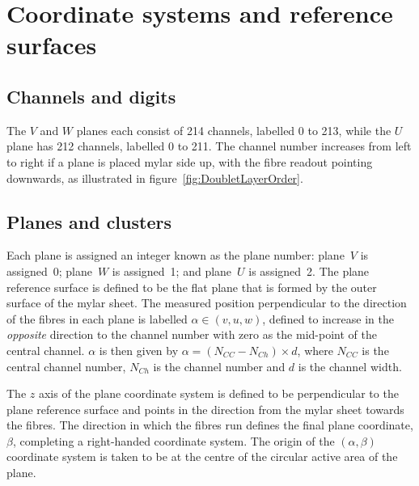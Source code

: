 \section{Coordinate systems and reference surfaces}
\label{sec:Coordinates}

  \subsection{Channels and digits}
  The $V$ and $W$ planes each consist of 214 channels, labelled 0 to 213, while the $U$ plane has 212 channels, labelled 0 to 211.  The channel number increases from left to right if a plane is placed mylar side up, with the fibre readout pointing downwards, as illustrated in figure~\ref{fig:DoubletLayerOrder}.

  \subsection{Planes and clusters}
  \label{subsec:PlaneAndClusters}
  Each plane is assigned an integer known as the plane number: plane~$V$ is assigned~0; plane~$W$ is assigned~1; and plane~$U$ is assigned~2.  The plane reference surface is defined to be the flat plane that is formed by the outer surface of the mylar sheet. The measured position perpendicular to the direction of the fibres in each plane is labelled  $\alpha \in (v, u, w)$, defined to increase in the \textit{opposite} direction to the channel number with zero as the mid-point of the central channel. $\alpha$ is then given by $\alpha = \left(N_{CC} - N_{Ch}\right) \times d$, where $N_{CC}$ is the central channel number, $N_{Ch}$ is the channel number and $d$ is the channel width.
  
% 
  
  The $z$ axis of the plane coordinate system is defined to be perpendicular to the plane reference surface and points in the direction from the mylar sheet towards the fibres. The direction in which the fibres run defines the final plane coordinate, $\beta$, completing a right-handed coordinate system. The origin of the $(\alpha, \beta)$ coordinate system is taken to be at the centre of the circular active area of the plane.

